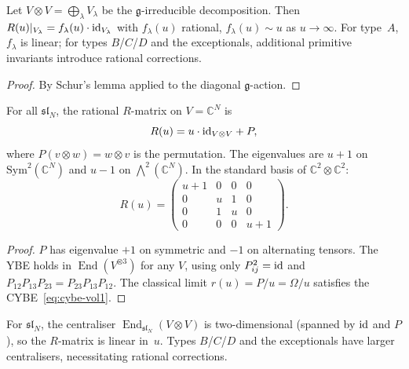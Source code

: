 \begin{proposition}
\label{prop:r-matrix-eigenvalue}
Let $V \otimes V = \bigoplus_\lambda V_\lambda$ be the
$\mathfrak{g}$-irreducible decomposition. Then
$R(u)|_{V_\lambda} = f_\lambda(u)\cdot\mathrm{id}_{V_\lambda}$
with $f_\lambda(u)$ rational, $f_\lambda(u) \sim u$ as
$u \to \infty$. For type~$A$, $f_\lambda$ is linear;
for types $B$/$C$/$D$ and the exceptionals, additional
primitive invariants introduce rational corrections.
\end{proposition}

\begin{proof}
By Schur's lemma applied to the diagonal $\mathfrak{g}$-action.
\end{proof}

\begin{theorem}
\label{thm:yang-r-sl2}
\label{thm:yang-r-sl3}
\label{thm:yang-r-sl4}
For all $\mathfrak{sl}_N$, the rational $R$-matrix on
$V = \mathbb{C}^N$ is
\begin{equation}\label{eq:yang-sl2}
R(u) = u\cdot\mathrm{id}_{V\otimes V} + P,
\end{equation}
where $P(v\otimes w) = w\otimes v$ is the permutation.
The eigenvalues are $u{+}1$ on
$\mathrm{Sym}^2(\mathbb{C}^N)$ and $u{-}1$ on
$\bigwedge^2(\mathbb{C}^N)$. In the standard basis of\/
$\mathbb{C}^2 \otimes \mathbb{C}^2$:
\begin{equation}\label{eq:yang-sl2-matrix}
R(u) =
\begin{pmatrix}
u{+}1 & 0 & 0 & 0 \\
0 & u & 1 & 0 \\
0 & 1 & u & 0 \\
0 & 0 & 0 & u{+}1
\end{pmatrix}.
\end{equation}
\end{theorem}

\begin{proof}
$P$ has eigenvalue $+1$ on symmetric and $-1$ on alternating
tensors. The YBE holds in
$\operatorname{End}(V^{\otimes 3})$ for any $V$, using only
$P_{ij}^2 = \mathrm{id}$ and
$P_{12}P_{13}P_{23} = P_{23}P_{13}P_{12}$.
The classical limit $r(u) = P/u = \Omega/u$ satisfies the
CYBE~\eqref{eq:cybe-vol1}.
\end{proof}

\begin{remark}
\label{rem:type-a-pattern}
For $\mathfrak{sl}_N$, the centraliser
$\operatorname{End}_{\mathfrak{sl}_N}(V\otimes V)$ is
two-dimensional (spanned by $\mathrm{id}$ and $P$), so the
$R$-matrix is linear in~$u$. Types $B$/$C$/$D$ and the
exceptionals have larger centralisers, necessitating
rational corrections.
\end{remark}


